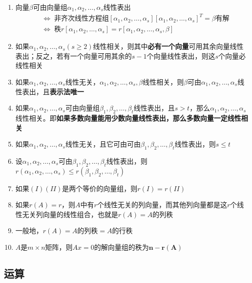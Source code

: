 \documentclass[a4paper,12pt]{article}
\begin{document}
\begin{enumerate}
        \item 向量$\beta$可由向量组$\alpha_1, \alpha_2, \dots, \alpha_s$线性表出
        \begin{align*}
            &\Leftrightarrow\; \text{非齐次线性方程组} [\alpha_1, \alpha_2, \dots, \alpha_s][\alpha_1, \alpha_2, \dots, \alpha_s]^T = \beta \text{有解} \\
            &\Leftrightarrow\; \text{秩} r[\alpha_1, \alpha_2, \dots, \alpha_s] = r[\alpha_1, \alpha_2, \dots, \alpha_s, \beta]
        \end{align*}
        \item 如果$\alpha_1, \alpha_2, \dots, \alpha_s (s \ge 2)$线性相关，则其中\textbf{必有一个向量}可用其余向量线性表出；反之，若有一个向量可用其余的$s-1$个向量线性表出，则这$s$个向量必线性相关
        \item 如果$\alpha_1, \alpha_2, \dots, \alpha_s$线性无关，$\alpha_1, \alpha_2, \dots, \alpha_s, \beta$线性相关，则$\beta$可由$\alpha_1, \alpha_2, \dots, \alpha_s$线性表出，且\textbf{表示法唯一}
        \item 如果$\alpha_1, \alpha_2, \dots, \alpha_s$可由向量组$\beta_1, \beta_2, \dots, \beta_t$线性表出，且$s > t$，那么$\alpha_1, \alpha_2, \dots, \alpha_s$线性相关。即\textbf{如果多数向量能用少数向量线性表出，那么多数向量一定线性相关}
        \item 如果$\alpha_1, \alpha_2, \dots, \alpha_s$线性无关，且它可由可由$\beta_1, \beta_2, \dots, \beta_t$线性表出，则$s \le t$
        \item 设$\alpha_1, \alpha_2, \dots, \alpha_s$可由$\beta_1, \beta_2, \dots, \beta_t$线性表出，则$r(\alpha_1, \alpha_2, \dots, \alpha_s) \le r(\beta_1, \beta_2, \dots, \beta_t)$
        \item 如果$(I)(II)$是两个等价的向量组，则$r(I) = r(II)$
        \item 如果$r(A) = r$，则$A$中有$r$个线性无关的列向量，而其他列向量都是这$r$个线性无关列向量的线性组合，也就是$r(A) = A$的列秩
        \item 一般地，$r(A) = A \text{的列秩} = A \text{的行秩}$
        \item $A$是$m \times n$矩阵，则$Ax = 0$的解向量组的秩为$\mathbf{n - r(A)}$
    \end{enumerate}

    \subsection{运算}
\end{document}
